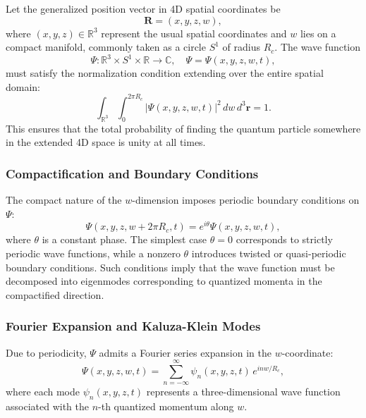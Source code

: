 \documentclass[12pt]{article}
\begin{document}
Let the generalized position vector in 4D spatial coordinates be
\begin{equation}
    \mathbf{R} = (x, y, z, w),
\end{equation}
where \((x,y,z) \in \mathbb{R}^3\) represent the usual spatial coordinates and \( w \) lies on a compact manifold, commonly taken as a circle \( S^1 \) of radius \( R_c \). The wave function
\begin{equation}
    \Psi : \mathbb{R}^3 \times S^1 \times \mathbb{R} \to \mathbb{C}, \quad \Psi = \Psi(x,y,z,w,t),
\end{equation}
must satisfy the normalization condition extending over the entire spatial domain:
\begin{equation}
    \int_{\mathbb{R}^3} \int_0^{2 \pi R_c} |\Psi(x,y,z,w,t)|^2 \, dw \, d^3 \mathbf{r} = 1.
\end{equation}
This ensures that the total probability of finding the quantum particle somewhere in the extended 4D space is unity at all times.

\subsubsection*{Compactification and Boundary Conditions}

The compact nature of the \( w \)-dimension imposes periodic boundary conditions on \(\Psi\):
\begin{equation}
    \Psi(x,y,z,w + 2\pi R_c, t) = e^{i \theta} \Psi(x,y,z,w,t),
\end{equation}
where \(\theta\) is a constant phase. The simplest case \(\theta = 0\) corresponds to strictly periodic wave functions, while a nonzero \(\theta\) introduces twisted or quasi-periodic boundary conditions. Such conditions imply that the wave function must be decomposed into eigenmodes corresponding to quantized momenta in the compactified direction.

\subsubsection*{Fourier Expansion and Kaluza-Klein Modes}

Due to periodicity, \(\Psi\) admits a Fourier series expansion in the \( w \)-coordinate:
\begin{equation}
    \Psi(x,y,z,w,t) = \sum_{n=-\infty}^{\infty} \psi_n(x,y,z,t) \, e^{i n w / R_c},
\end{equation}
where each mode \(\psi_n(x,y,z,t)\) represents a three-dimensional wave function associated with the \(n\)-th quantized momentum along \(w\).
\end{document}
